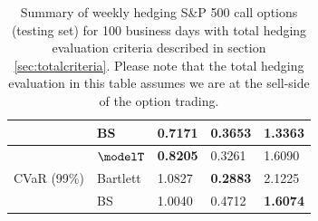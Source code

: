 \begin{table}[htp!]
\begin{tabular}{ll|l|l|l|}
		\multicolumn{1}{|l|}{}                                & BS       & 0.7171          & 0.3653          & \textbf{1.3363} \\ \hline
		\multicolumn{1}{|l|}{\multirow{3}{*}{CVaR (99\%)}}    & $\modelT$    & \textbf{0.8205}          & 0.3261 & 1.6090          \\  
		\multicolumn{1}{|l|}{}                                & Bartlett & 1.0827          & \textbf{0.2883}          & 2.1225          \\  
		\multicolumn{1}{|l|}{}                                & BS       & 1.0040          & 0.4712          & \textbf{1.6074} \\ \hline
	\end{tabular}
	\caption{Summary of weekly hedging S\&P 500 call options (testing set) for 100 business days with total hedging evaluation criteria described in  section \ref{sec:totalcriteria}. Please note that the total hedging evaluation in this table assumes we are at the sell-side of the option trading.} \label{table:CallTotalW}
\end{table}
